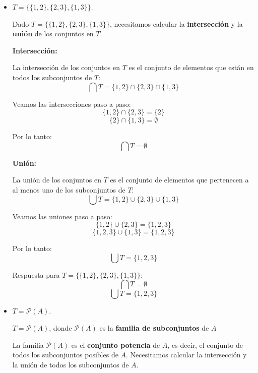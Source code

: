 \begin{solution}
    \begin{itemize}
        \item \( T = \{\{1, 2\}, \{2, 3\}, \{1, 3\}\} \).
        
            Dado \( T = \{\{1, 2\}, \{2, 3\}, \{1, 3\}\} \), necesitamos calcular la \textbf{intersección} y la \textbf{unión} de los conjuntos en \( T \).
            
            \textbf{Intersección:}
            
            La intersección de los conjuntos en \( T \) es el conjunto de elementos que están en todos los subconjuntos de \( T \):
            \[
            \bigcap T = \{1, 2\} \cap \{2, 3\} \cap \{1, 3\}
            \]
            
            Veamos las intersecciones paso a paso:
            \[
            \{1, 2\} \cap \{2, 3\} = \{2\}
            \]
            \[
            \{2\} \cap \{1, 3\} = \emptyset
            \]
            
            Por lo tanto:
            \[
            \bigcap T = \emptyset
            \]
            
            \textbf{Unión:}
            
            La unión de los conjuntos en \( T \) es el conjunto de elementos que pertenecen a al menos uno de los subconjuntos de \( T \):
            \[
            \bigcup T = \{1, 2\} \cup \{2, 3\} \cup \{1, 3\}
            \]
            
            Veamos las uniones paso a paso:
            \[
            \{1, 2\} \cup \{2, 3\} = \{1, 2, 3\}
            \]
            \[
            \{1, 2, 3\} \cup \{1, 3\} = \{1, 2, 3\}
            \]
            
            Por lo tanto:
            \[
            \bigcup T = \{1, 2, 3\}
            \]
            
            Respuesta para \( T = \{\{1, 2\}, \{2, 3\}, \{1, 3\}\} \):
            \[
            \bigcap T = \emptyset
            \]
            \[
            \bigcup T = \{1, 2, 3\}
            \]
        \item \( T = \mathscr{P}(A) \).

        \( T = \mathscr{P}(A) \), donde \( \mathscr{P}(A) \) es la \textbf{familia de subconjuntos} de \( A \)

        La familia \( \mathscr{P}(A) \) es el \textbf{conjunto potencia} de \( A \), es decir, el conjunto de todos los subconjuntos posibles de \( A \). Necesitamos calcular la intersección y la unión de todos los subconjuntos de \( A \).
        

\end{itemize}
\end{solution}

